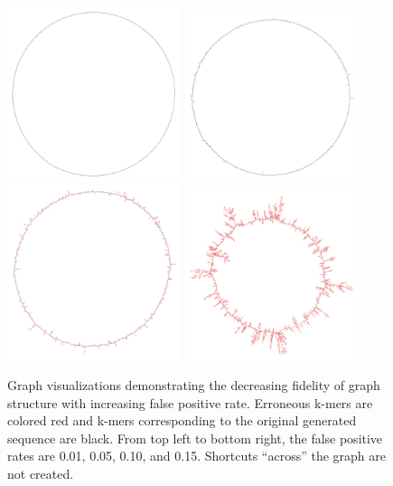 \documentclass{pnastwo}
\begin{document}
\begin{figure}
\includegraphics[width=2in]{f3b001}
\includegraphics[width=2in]{f3b005}
\includegraphics[width=2in]{f3b010}
\includegraphics[width=2in]{f3b015}

\caption{Graph visualizations demonstrating the decreasing fidelity of
  graph structure with increasing false positive rate. Erroneous k-mers are 
  colored red and k-mers corresponding to the original generated sequence 
  are black. From top left
  to bottom right, the false positive rates are 0.01, 0.05, 0.10, and
  0.15.  Shortcuts ``across'' the graph are not created.}

\label{fig:circles}
\end{figure}
\end{document}
